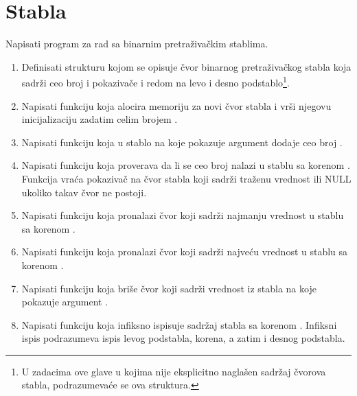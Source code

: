 \section{Stabla}

\begin{Exercise}[label=701]
Napisati program za rad sa binarnim pretraživačkim stablima.
\begin{enumerate}
\item Definisati strukturu  kojom se opisuje čvor binarnog pretraživačkog stabla koja sadrži ceo broj  i pokazivače  i  redom na levo i desno podstablo\footnote{U zadacima ove glave u kojima nije eksplicitno naglašen sadržaj čvorova stabla, podrazumevaće se ova struktura.}.

\item Napisati funkciju  koja alocira memoriju za novi čvor stabla i vrši njegovu inicijalizaciju zadatim celim brojem .

\item Napisati funkciju  koja u stablo na koje pokazuje argument  dodaje ceo broj .

\item Napisati funkciju  koja proverava da li se ceo broj  nalazi u stablu sa korenom . Funkcija vraća pokazivač na čvor stabla koji sadrži traženu vrednost ili NULL ukoliko takav čvor ne postoji.

\item Napisati funkciju  koja pronalazi čvor koji sadrži najmanju vrednost u stablu sa korenom . 

\item Napisati funkciju  koja pronalazi čvor koji sadrži najveću vrednost u stablu sa korenom .

\item Napisati funkciju  koja briše čvor koji sadrži vrednost  iz stabla na koje pokazuje argument .

\item Napisati funkciju  koja infiksno ispisuje sadržaj stabla sa korenom . Infiksni ispis podrazumeva ispis levog podstabla, korena, a zatim i desnog podstabla.


\end{enumerate}
\end{Exercise}
